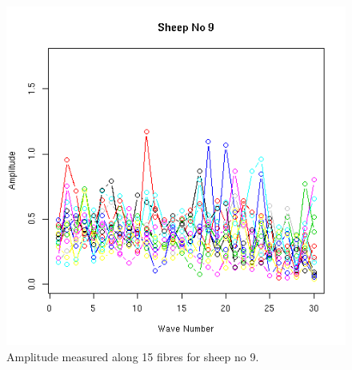 %

\begin{figure}[!h]
  \centering
  \includegraphics[width=1.0\textwidth]{figsfampl.png}
  \caption{Amplitude measured along 15 fibres for sheep no 9.}
  \label{fig:sfampl}
\end{figure}

%

